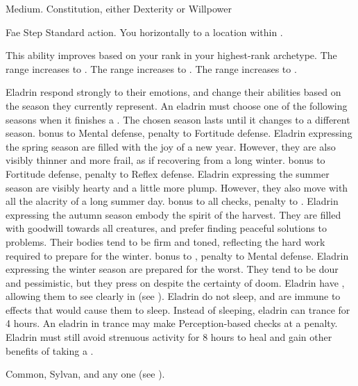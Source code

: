    Medium.
    Constitution, either  Dexterity or  Willpower
  \begin{raggeditemize}
      \begin{magicalactiveability}{Fae Step}
        \abilityusagetime Standard action.
        \rankline
        You  horizontally to a location within \shortrange.

        \rankline
        This ability improves based on your rank in your highest-rank archetype.
         The range increases to \medrange.
         The range increases to \longrange.
         The range increases to \distrange.
      \end{magicalactiveability}
     Eladrin respond strongly to their emotions, and change their abilities based on the season they currently represent.
      An eladrin must choose one of the following seasons when it finishes a .
      The chosen season lasts until it changes to a different season.
        bonus to Mental defense,  penalty to Fortitude defense.
      Eladrin expressing the spring season are filled with the joy of a new year.
      However, they are also visibly thinner and more frail, as if recovering from a long winter.
        bonus to Fortitude defense,  penalty to Reflex defense.
      Eladrin expressing the summer season are visibly hearty and a little more plump.
      However, they also move with all the alacrity of a long summer day.
        bonus to all checks,  penalty to .
      Eladrin expressing the autumn season embody the spirit of the harvest.
      They are filled with goodwill towards all creatures, and prefer finding peaceful solutions to problems.
      Their bodies tend to be firm and toned, reflecting the hard work required to prepare for the winter.
        bonus to ,  penalty to Mental defense.
      Eladrin expressing the winter season are prepared for the worst.
      They tend to be dour and pessimistic, but they press on despite the certainty of doom.
     Eladrin have , allowing them to see clearly in  (see ).
     Eladrin do not sleep, and are immune to \magical effects that would cause them to sleep.
      Instead of sleeping, eladrin can trance for 4 hours.
      An eladrin in trance may make Perception-based checks at a  penalty.
      Eladrin must still avoid strenuous activity for 8 hours to heal and gain other benefits of taking a .
  \end{raggeditemize}
   Common, Sylvan, and any one  (see ).

